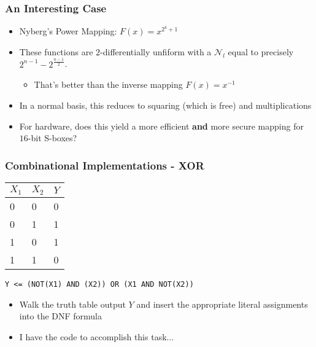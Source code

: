 \documentclass[handout]{beamer}
\begin{document}
\begin{frame}
	\frametitle{An Interesting Case}
	\begin{itemize}
		\item Nyberg's Power Mapping: $F(x) = x^{2^{k} + 1}$
		\item These functions are $2$-differentially unfiform with a $\mathcal{N}_l$ equal to precisely $2^{n-1} - 2^{\frac{n-1}{2}}$.
		\begin{itemize}
			\item That's better than the inverse mapping $F(x) = x^{-1}$
		\end{itemize}
		\item In a normal basis, this reduces to squaring (which is free) and multiplications
		\item For hardware, does this yield a more efficient \textbf{and} more secure mapping for $16$-bit S-boxes?
	\end{itemize}
\end{frame}



\begin{frame}
	\frametitle{Combinational Implementations - XOR}
\begin{table}
	\begin{tabular}{|l|l|l|}
		\hline
		$X_1$ & $X_2$ & $Y$ \\ \hline
		0 & 0 & 0 \\ 
		0 & 1 & 1 \\
		1 & 0 & 1 \\ 
		1 & 1 & 0 \\
		\hline
	\end{tabular}
\end{table}

\begin{center}
	{\tt Y <= (NOT(X1) AND (X2)) OR (X1 AND NOT(X2))}
\end{center}

\begin{itemize}
	\item Walk the truth table output $Y$ and insert the appropriate literal assignments into the DNF formula
	\item I have the code to accomplish this task... 
\end{itemize}
\end{frame}
\end{document}
